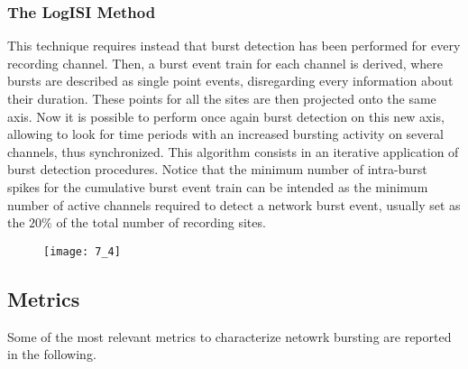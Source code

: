 \subsubsection{The LogISI Method}
This technique requires instead that burst detection has been performed for every
recording channel. Then, a burst event train for each channel is derived, where
bursts are described as single point events, disregarding every information about
their duration. These points for all the sites are then projected onto the same axis.
Now it is possible to perform once again burst detection on this new axis, allowing
to look for time periods with an increased bursting activity on several channels, thus
synchronized. This algorithm consists in an iterative application of burst detection
procedures. Notice that the minimum number of intra-burst spikes for the cumulative
burst event train can be intended as the minimum number of active channels required
to detect a network burst event, usually set as the \(20\%\) of the total number of
recording sites.
\begin{figure}[H]
    \texttt{[image: 7\_4]}
    \centering
\end{figure}

\subsection{Metrics}
Some of the most relevant metrics to characterize netowrk bursting are reported
in the following.

